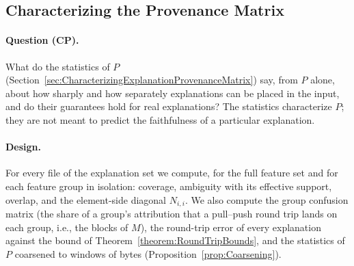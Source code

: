 
\subsection{Characterizing the Provenance Matrix}
\label{sec:XML:CharacterizingP}

\paragraph{Question (CP).} What do the statistics of $P$ (Section~\ref{sec:CharacterizingExplanationProvenanceMatrix}) say, from $P$ alone, about how sharply and how separately explanations can be placed in the input, and do their guarantees hold for real explanations? The statistics characterize $P$; they are not meant to predict the faithfulness of a particular explanation.

\paragraph{Design.} For every file of the explanation set we compute, for the full feature set and for each feature group in isolation: coverage, ambiguity with its effective support, overlap, and the element-side diagonal $N_{i,i}$. We also compute the group confusion matrix (the share of a group's attribution that a pull--push round trip lands on each group, i.e., the blocks of $M$), the round-trip error of every explanation against the bound of Theorem~\ref{theorem:RoundTripBounds}, and the statistics of $P$ coarsened to windows of bytes (Proposition~\ref{prop:Coarsening}).

